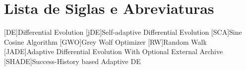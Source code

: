 \chapter*{Lista de Siglas e Abreviaturas}
\begin{acronym}

[DE]{Differential Evolution}
[jDE]{Self-adaptive Differential Evolution}
[SCA]{Sine Cosine Algorithm}
[GWO]{Grey Wolf Optimizer}
[RW]{Random Walk}
[JADE]{Adaptive Differential Evolution With Optional External Archive}
[SHADE]{Success-History based Adaptive DE}

\end{acronym}
